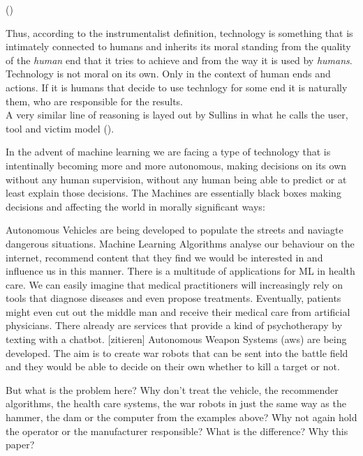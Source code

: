 \documentclass{article}
\newcounter{example}[section]
\begin{document}
(\cite[p.4]{heidegger1977technology})

Thus, according to the instrumentalist definition, technology is something that
is intimately connected to humans and inherits its moral standing from the
quality of the \textit{human} end that it tries to achieve and from the way
it is used by \textit{humans}. Technology is not moral on its own. Only in the
context of human ends and actions. If it is humans that decide to use technlogy
for some end it is naturally them, who are responsible for the results.\\
A very similar line of reasoning is layed out by Sullins in what he calls the user, tool and victim
model (\cite[p. 152]{sullins2006robot}).

In the advent of machine learning we are facing a type of technology that is
intentinally becoming more and more autonomous, making decisions on its own
without any human supervision, without any human being able to predict or at
least explain those decisions. The Machines are essentially black boxes making
decisions and affecting the world in morally significant ways:

Autonomous Vehicles are being developed to populate the streets and naviagte
dangerous situations.
Machine Learning Algorithms analyse our behaviour on the internet, recommend
content that they find we would be interested in and influence us in this
manner.
There is a multitude of applications for ML in health care. We can easily
imagine that medical practitioners will increasingly rely on tools that diagnose
diseases and even propose treatments. Eventually, patients might even cut
out the middle man and receive their medical care from artificial physicians.
There already are services that provide a kind of psychotherapy by texting with
a chatbot. [zitieren]
Autonomous Weapon Systems (\acrshort{aws}) are being developed. The aim is to
create war robots that can be sent into the battle field and they would be able
to decide on their own whether to kill a target or not.

But what is the problem here? Why don't treat the vehicle, the recommender
algorithms, the health care systems, the war robots in just the same way as the
hammer, the dam or the computer from the examples above? Why not again hold the
operator or the manufacturer responsible? What is the difference? Why this
paper?
\end{document}
